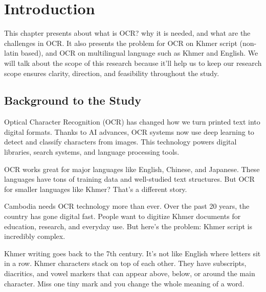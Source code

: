 \clearpage
{}
\setcounter{page}{1}

\label{ch:intro}
\chapter{Introduction}

This chapter presents about what is OCR? why it is needed, and
what are the challenges in OCR. It also presents the problem 
for OCR on Khmer script (non-latin based), and OCR on multilingual
language such as Khmer and English. We will talk about the scope
of this research because it'll help us to keep 
our research scope ensures clarity, direction, and feasibility 
throughout the study.

\section{Background to the Study}
\label{sec:background}

Optical Character Recognition (OCR) has changed how we turn printed text into digital formats. Thanks to AI advances, OCR systems now use deep learning to detect and classify characters from images. This technology powers digital libraries, search systems, and language processing tools.

OCR works great for major languages like English, Chinese, and Japanese. These languages have tons of training data and well-studied text structures. But OCR for smaller languages like Khmer? That's a different story.

Cambodia needs OCR technology more than ever. Over the past 20 years, the country has gone digital fast. People want to digitize Khmer documents for education, research, and everyday use. But here's the problem: Khmer script is incredibly complex.

Khmer writing goes back to the 7th century. It's not like English where letters sit in a row. Khmer characters stack on top of each other. They have subscripts, diacritics, and vowel markers that can appear above, below, or around the main character. Miss one tiny mark and you change the whole meaning of a word.

